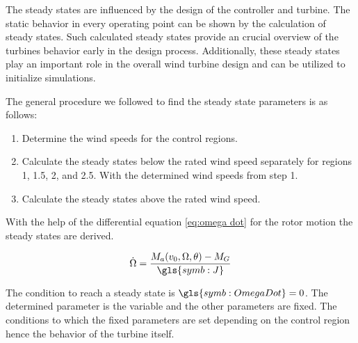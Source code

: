 
The steady states are influenced by the design of the controller and turbine.
The static behavior in every operating point can be shown by the calculation of steady states.
Such calculated steady states provide an crucial overview of the turbines behavior early in the design process.
Additionally, these steady states play an important role in the overall wind turbine design and can be utilized to initialize simulations.

The general procedure we followed to find the steady state parameters is as follows: 
\begin{enumerate}
	\item Determine the wind speeds for the control regions. 
	\item Calculate the steady states below the rated wind speed separately for regions 1, 1.5, 2, and 2.5. With the determined wind speeds from step 1.
	\item Calculate the steady states above the rated wind speed.
\end{enumerate}

With the help of the differential equation \ref{eq:omega dot} for the rotor motion the steady states are derived.

\begin{equation}
	\dot{\Omega} = \frac{M_a(v_0, \Omega, \theta) - M_G}{\gls{symb:J}}
	\label{eq:omega dot}
\end{equation}

The condition to reach a steady state is $\gls{symb:OmegaDot} = 0$. The determined parameter is the variable and the other parameters are fixed. The conditions to which the fixed parameters are set depending on the control region hence the behavior of the turbine itself.

%
%
%

